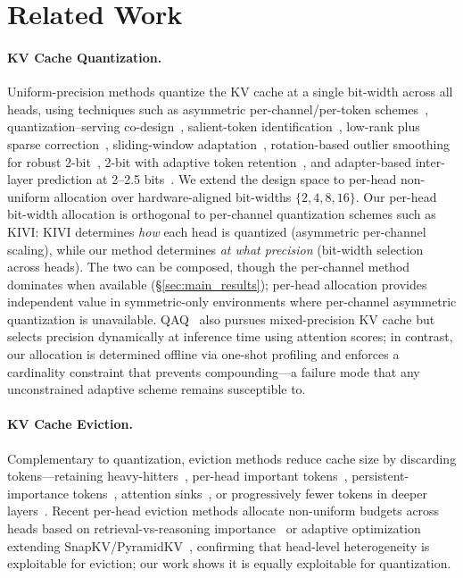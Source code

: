 \section{Related Work}\label{sec:related_work}

\paragraph{KV Cache Quantization.}
Uniform-precision methods quantize the KV cache at a single bit-width across all heads, using techniques such as asymmetric per-channel/per-token schemes~\cite{liu2024kivi,hooper2024kvquant}, quantization--serving co-design~\cite{lin2024qserve}, salient-token identification~\cite{he2024zipcache}, low-rank plus sparse correction~\cite{kang2024gear}, sliding-window adaptation~\cite{duanmu2024skvq}, rotation-based outlier smoothing for robust 2-bit~\cite{su2025rotatekv}, 2-bit with adaptive token retention~\cite{sharma2025minikv}, and adapter-based inter-layer prediction at 2--2.5 bits~\cite{shutova2025aquakv}.
We extend the design space to per-head non-uniform allocation over hardware-aligned bit-widths $\{2,4,8,16\}$.
Our per-head bit-width allocation is orthogonal to per-channel quantization schemes such as KIVI: KIVI determines \emph{how} each head is quantized (asymmetric per-channel scaling), while our method determines \emph{at what precision} (bit-width selection across heads).
The two can be composed, though the per-channel method dominates when available (\S\ref{sec:main_results}); per-head allocation provides independent value in symmetric-only environments where per-channel asymmetric quantization is unavailable.
QAQ~\cite{dong2024qaq} also pursues mixed-precision KV cache but selects precision dynamically at inference time using attention scores; in contrast, our allocation is determined offline via one-shot profiling and enforces a cardinality constraint that prevents compounding---a failure mode that any unconstrained adaptive scheme remains susceptible to.

\paragraph{KV Cache Eviction.}
Complementary to quantization, eviction methods reduce cache size by discarding tokens---retaining heavy-hitters~\cite{zhang2023h2o}, per-head important tokens~\cite{li2024snapkv,ge2024fastgen}, persistent-importance tokens~\cite{liu2024scissorhands}, attention sinks~\cite{xiao2024streamingllm}, or progressively fewer tokens in deeper layers~\cite{yang2024pyramidinfer}.
Recent per-head eviction methods allocate non-uniform budgets across heads based on retrieval-vs-reasoning importance~\cite{fu2025headkv} or adaptive optimization extending SnapKV/PyramidKV~\cite{feng2025adakv}, confirming that head-level heterogeneity is exploitable for eviction; our work shows it is equally exploitable for quantization.


